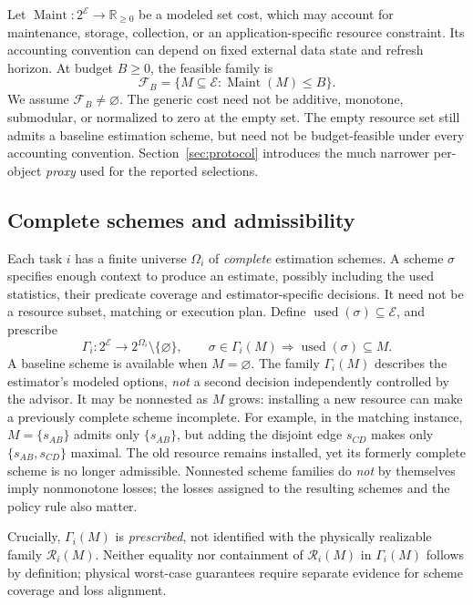 \documentclass[sigconf, nonacm]{acmart}
\newcommand{\E}{\mathcal E}
\newcommand{\Maint}{\operatorname{Maint}}
\begin{document}
Let \(\Maint:2^\E\to\mathbb R_{\geq0}\) be a
modeled set cost, which may account for maintenance,
storage, collection, or an application-specific resource
constraint. Its accounting convention can depend on fixed
external data state and refresh horizon. At budget
\(B\geq0\), the feasible family is
\begin{equation}
\label{eq:feasible}
\mathcal F_B=\{M\subseteq\E:\Maint(M)\leq B\}.
\end{equation}
We assume \(\mathcal F_B\ne\varnothing\).
The generic cost need not be additive, monotone,
submodular, or normalized to zero at the empty set.
The empty resource set still admits a baseline estimation
scheme, but need not be budget-feasible under every
accounting convention. Section~\ref{sec:protocol} introduces the much narrower
per-object \emph{proxy} used for the reported selections.

\subsection{Complete schemes and admissibility}
Each task \(i\) has a finite universe \(\Omega_i\) of \emph{complete}
estimation schemes. A scheme \(\sigma\) specifies enough context to
produce an estimate, possibly including the used statistics, their
predicate coverage and estimator-specific decisions. It need not be a
resource subset, matching or execution plan. Define
\(\operatorname{used}(\sigma)\subseteq\E\), and prescribe
\begin{equation}
\label{eq:gamma}
\Gamma_i:2^\E\longrightarrow 2^{\Omega_i}\setminus\{\varnothing\},
\qquad
\sigma\in\Gamma_i(M)\Rightarrow
\operatorname{used}(\sigma)\subseteq M.
\end{equation}
A baseline scheme is available when \(M=\varnothing\).
The family \(\Gamma_i(M)\) describes the estimator's modeled
options, \emph{not} a second decision independently controlled
by the advisor. It may be nonnested as \(M\) grows:
installing a new resource can make a previously complete
scheme incomplete. For example, in the matching instance,
\(M=\{s_{AB}\}\) admits only \(\{s_{AB}\}\), but adding
the disjoint edge \(s_{CD}\) makes only
\(\{s_{AB},s_{CD}\}\) maximal. The old resource remains
installed, yet its formerly complete scheme is no longer
admissible. Nonnested scheme families do \emph{not} by
themselves imply nonmonotone losses; the losses assigned to
the resulting schemes and the policy rule also matter.

Crucially, \(\Gamma_i(M)\) is \emph{prescribed}, not
identified with the physically realizable family
\(\mathcal R_i(M)\). Neither equality nor containment of
\(\mathcal R_i(M)\) in \(\Gamma_i(M)\) follows by definition;
physical worst-case guarantees require separate evidence
for scheme coverage and loss alignment.
\end{document}
